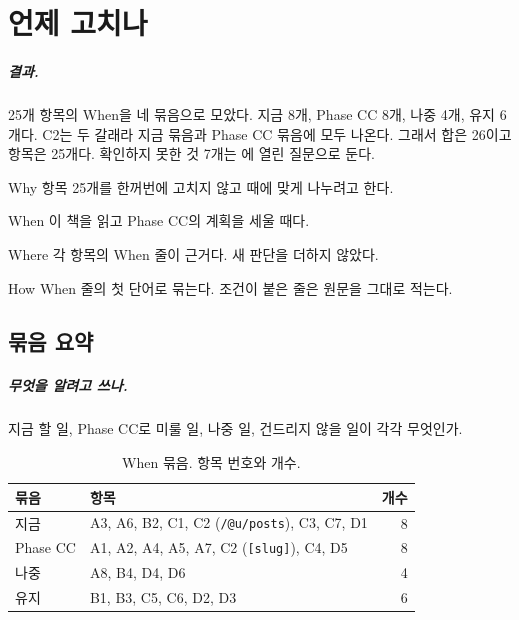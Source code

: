 \chapter{언제 고치나}\label{ch:plan}

\paragraph{결과.}
25개 항목의 When을 네 묶음으로 모았다.
지금 8개, Phase CC 8개, 나중 4개, 유지 6개다.
C2는 두 갈래라 지금 묶음과 Phase CC 묶음에 모두 나온다. 그래서 합은 26이고 항목은 25개다.
확인하지 못한 것 7개는 에 열린 질문으로 둔다.

\begin{inbrief}
  \item[Why] 항목 25개를 한꺼번에 고치지 않고 때에 맞게 나누려고 한다.
  \item[When] 이 책을 읽고 Phase CC의 계획을 세울 때다.
  \item[Where] 각 항목의 When 줄이 근거다. 새 판단을 더하지 않았다.
  \item[How] When 줄의 첫 단어로 묶는다. 조건이 붙은 줄은 원문을 그대로 적는다.
\end{inbrief}

\section{묶음 요약}\label{sec:pl-buckets}

\paragraph{무엇을 알려고 쓰나.}
지금 할 일, Phase CC로 미룰 일, 나중 일, 건드리지 않을 일이 각각 무엇인가.

\begin{table}[H]
  \caption{When 묶음. 항목 번호와 개수.}
  \label{tab:pl-buckets}
  \centering\small
  \begin{tabularx}{\linewidth}{@{}L{2.4cm} Y r@{}}
    \toprule
    묶음 & 항목 & 개수 \\
    \midrule
    지금 & A3, A6, B2, C1, C2 (\texttt{/@u/posts}), C3, C7, D1 & 8 \\
    \midrule
    Phase CC & A1, A2, A4, A5, A7, C2 (\texttt{[slug]}), C4, D5 & 8 \\
    \midrule
    나중 & A8, B4, D4, D6 & 4 \\
    \midrule
    유지 & B1, B3, C5, C6, D2, D3 & 6 \\
    \bottomrule
  \end{tabularx}
\end{table}

